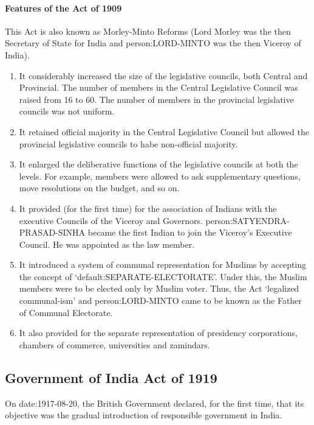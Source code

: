 \begin{multicols}{2}
\paragraph{Features of the Act of 1909}
This Act is also known as Morley-Minto Reforms (Lord Morley was the then Secretary of State for India and \gls{person:LORD-MINTO} was the then Viceroy of India).
\begin{enumerate}
  \item It considerably increased the size of the legislative councils, both Central and Provincial. The number of members in the Central Legislative Council was raised from 16 to 60. The number of members in the provincial legislative councils was not uniform.
  \item It retained official majority in the Central Legislative Council but allowed the provincial legislative councils to habe non-official majority.
  \item It enlarged the deliberative functions of the legislative councils at both the levels. For example, members were allowed to ask supplementary questions, move resolutions on the budget, and so on.
  \item It provided (for the first time) for the association of Indians with the executive Councils of the Viceroy and Governors. \gls{person:SATYENDRA-PRASAD-SINHA} became the first Indian to join the Viceroy's Executive Council. He was appointed as the law member.
  \item It introduced a system of communal representation for Muslims by accepting the concept of `\gls{default:SEPARATE-ELECTORATE}'. Under this, the Muslim members were to be elected only by Muslim voter. Thus, the Act `legalized communal-ism' and \gls{person:LORD-MINTO} came to be known as the Father of Communal Electorate.
  \item It also provided for the separate representation of presidency corporations, chambers of commerce, universities and zamindars.
\end{enumerate}

\subsection{Government of India Act of 1919}

On \gls{date:1917-08-20}, the British Government declared, for the first time, that its objective was the gradual introduction of responsible government in India.


\end{multicols}
